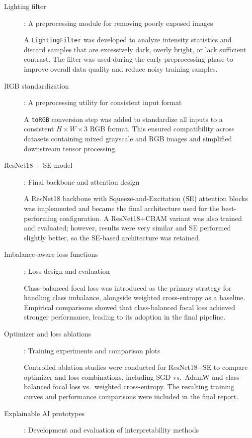 \begin{description}
  \item [Lighting filter]: A preprocessing module for removing poorly exposed images

    A \texttt{LightingFilter} was developed to analyze intensity statistics and discard samples that are excessively dark, overly bright, or lack sufficient contrast. The filter was used during the early preprocessing phase to improve overall data quality and reduce noisy training samples.

  \item [RGB standardization]: A preprocessing utility for consistent input format

    A \texttt{toRGB} conversion step was added to standardize all inputs to a consistent $H \times W \times 3$ RGB format. This ensured compatibility across datasets containing mixed grayscale and RGB images and simplified downstream tensor processing.

  \item [ResNet18 + SE model]: Final backbone and attention design

    A ResNet18 backbone with Squeeze-and-Excitation (SE) attention blocks was implemented and became the final architecture used for the best-performing configuration. A ResNet18+CBAM variant was also trained and evaluated; however, results were very similar and SE performed slightly better, so the SE-based architecture was retained.

  \item [Imbalance-aware loss functions]: Loss design and evaluation

    Class-balanced focal loss was introduced as the primary strategy for handling class imbalance, alongside weighted cross-entropy as a baseline. Empirical comparisons showed that class-balanced focal loss achieved stronger performance, leading to its adoption in the final pipeline.

  \item [Optimizer and loss ablations]: Training experiments and comparison plots

    Controlled ablation studies were conducted for ResNet18+SE to compare optimizer and loss combinations, including SGD vs.\ AdamW and class-balanced focal loss vs.\ weighted cross-entropy. The resulting training curves and performance comparisons were included in the final report.

  \item [Explainable AI prototypes]: Development and evaluation of interpretability methods


\end{description}
